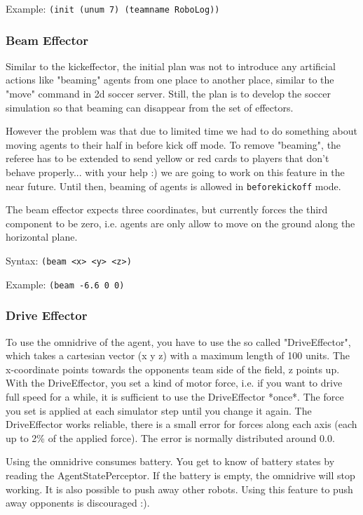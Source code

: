 Example: \texttt{(init (unum 7) (teamname RoboLog))}

\subsubsection{Beam Effector}

Similar to the kickeffector, the initial plan was not to introduce any
artificial actions like "beaming" agents from one place to another
place, similar to the "move" command in 2d soccer server. Still, the
plan is to develop the soccer simulation so that beaming can disappear
from the set of effectors.

However the problem was that due to limited time we had to do
something about moving agents to their half in before kick off mode.
To remove "beaming", the referee has to be extended to send yellow or
red cards to players that don't behave properly... with your help :)
we are going to work on this feature in the near future. Until then,
beaming of agents is allowed in \texttt{beforekickoff} mode.

The beam effector expects three coordinates, but currently forces the
third component to be zero, i.e. agents are only allow to move on the
ground along the horizontal plane.

Syntax: \texttt{(beam <x> <y> <z>)}

Example: \texttt{(beam  -6.6 0 0)}

\subsubsection{Drive Effector}

To use the omnidrive of the agent, you have to use the so called
"DriveEffector", which takes a cartesian vector (x y z) with a maximum
length of 100 units. The x-coordinate points towards the opponents
team side of the field, z points up. With the DriveEffector, you set a
kind of motor force, i.e. if you want to drive full speed for a while,
it is sufficient to use the DriveEffector *once*. The force you set is
applied at each simulator step until you change it again. The
DriveEffector works reliable, there is a small error for forces along
each axis (each up to 2\% of the applied force). The error is normally
distributed around 0.0.

Using the omnidrive consumes battery. You get to know of battery
states by reading the AgentStatePerceptor. If the battery is empty,
the omnidrive will stop working. It is also possible to push away
other robots. Using this feature to push away opponents is discouraged
:).

